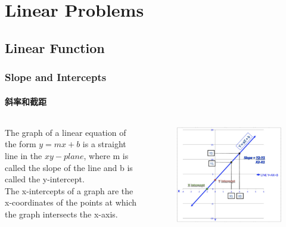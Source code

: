 \documentclass[
	11pt, %
	handout,
]{beamer}
\begin{document}

 \section{Linear Problems}


\subsection{Linear Function}


\begin{frame}
	\frametitle{Slope and Intercepts}
	\framesubtitle{斜率和截距}

	\begin{columns}[t] 
		\begin{column}{0.4\textwidth} %
			\begin{definition}
						The graph of a linear equation of the form $y = mx + b$ is a straight line
				in the $xy-plane$, where m is called the \alert{slope} of the line and b is called the \alert{y-intercept}. \\
				The x-intercepts of a graph are the \alert{x-coordinates} of the points at which the graph intersects the x-axis.
			\end{definition}
		\end{column}
		\begin{column}{0.6\textwidth} %
			\begin{figure}
				\includegraphics[width=\linewidth]{how-to-calculate-slope-and-intercepts-of-a-line-thumb-mMPHze60u.jpeg}
			\end{figure}
    \end{column}
	\end{columns}
\end{frame}
\end{document}
